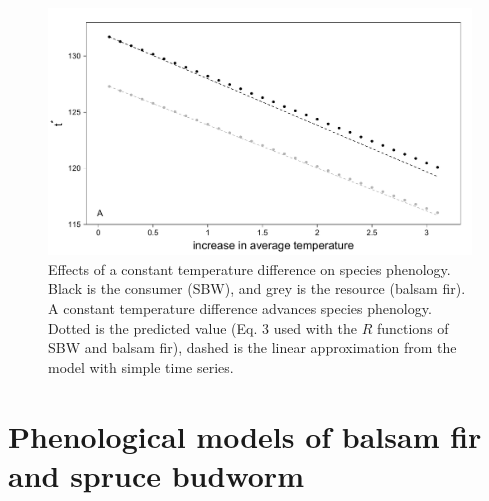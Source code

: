 \documentclass[12 pt]{article}
\begin{document}
\begin{figure}[ht]
\begin{center}
\renewcommand{\thefigure}{S\arabic{figure}}
\setcounter{figure}{0}
\includegraphics[width = 16 cm, keepaspectratio]{FigureS1}
\caption{\doublespacing Effects of a constant temperature difference on species phenology. Black is the consumer (SBW), and grey is the resource (balsam fir). A constant temperature difference advances species phenology. Dotted is the predicted value (Eq. 3 used with the $R$ functions of SBW and balsam fir), dashed is the linear approximation from the model with simple time series.}
\end{center}
\end{figure}

\clearpage
\section{Phenological models of balsam fir and spruce budworm}
\end{document}
